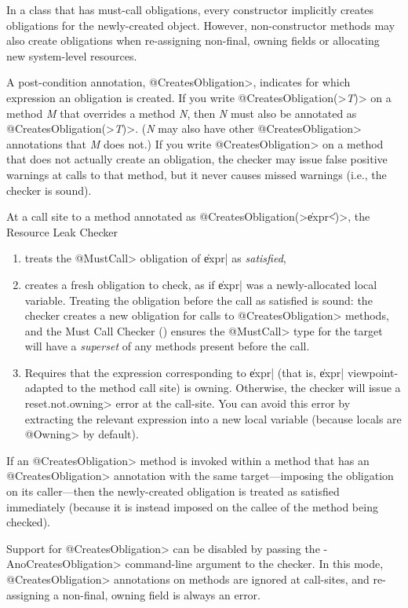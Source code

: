 In a class that has must-call obligations,
every constructor implicitly creates obligations for the newly-created object.
However, non-constructor methods may also create obligations
when re-assigning non-final, owning fields or allocating
new system-level resources.

A post-condition annotation,
\<@CreatesObligation>,
indicates for which expression an obligation is created.
If you write \<@CreatesObligation(>\emph{T}\<)> on a method \emph{M} that
overrides a method \emph{N}, then \emph{N} must also be annotated as
\<@CreatesObligation(>\emph{T}\<)>.  (\emph{N} may also have other
\<@CreatesObligation> annotations that \emph{M} does not.)
If you write \<@CreatesObligation> on a method that does not actually
create an obligation, the checker may issue false positive warnings at calls to
that method, but it never causes
missed warnings (i.e., the checker is sound).

At a call site to a method annotated as
\<@CreatesObligation(>\|expr\|<)>, the Resource Leak Checker
\begin{enumerate}
\item
  treats the \<@MustCall> obligation of \|expr| as \emph{satisfied},
\item
  creates a fresh obligation to check, as if \|expr| was a newly-allocated local
  variable.  Treating the obligation before the call as satisfied is sound: the
  checker creates a new obligation for calls to \<@CreatesObligation> methods,
  and the Must Call Checker () ensures the
  \<@MustCall> type for the target will have a \emph{superset} of any methods
  present before the call.
\item
  Requires that the expression corresponding to \|expr| (that is, \|expr|
  viewpoint-adapted to the method call site) is owning.  Otherwise, the checker
  will issue a \<reset.not.owning> error at the call-site. You can avoid this
  error by extracting the relevant expression into a new local variable (because
  locals are \<@Owning> by default).
\end{enumerate}

If an \<@CreatesObligation>
method is invoked within a method that has an \<@CreatesObligation> annotation
with the same target---imposing the obligation on its caller---then
the newly-created obligation is treated as satisfied immediately (because it is instead imposed
on the callee of the method being checked).

Support for \<@CreatesObligation> can be disabled by passing the \<-AnoCreatesObligation> command-line
argument to the checker. In this mode, \<@CreatesObligation> annotations on methods are ignored at call-sites,
and re-assigning a non-final, owning field is always an error.


